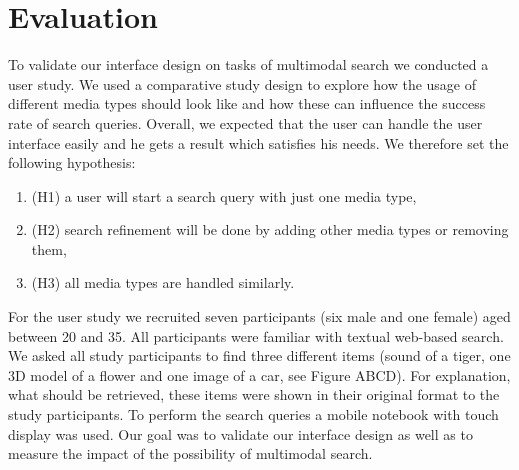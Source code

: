 \documentclass[runningheads,a4paper]{llncs} \usepackage[utf8]{inputenc}
\begin{document}
\section{Evaluation}

To validate our interface design on tasks of multimodal search we conducted a
user study. We used a comparative study design to explore how the usage of
different media types should look like and how these can influence the success
rate of search queries. Overall, we expected that the user can handle the user
interface easily and he gets a result which satisfies his needs. We therefore
set the following hypothesis: 
\begin{enumerate}
  \item (H1) a user will start a search query with just
one media type,
  \item (H2) search refinement will be done by adding other media types
or removing them,
  \item (H3) all media types are handled similarly. 
\end{enumerate}

For the user study we recruited seven participants (six male and one female)
aged between 20 and 35. All participants were familiar with textual web-based
search. We asked all study participants to find three different items (sound of
a tiger, one 3D model of a flower and one image of a car, see Figure ABCD). For
explanation, what should be retrieved, these items were shown in their original
format to the study participants. To perform the search queries a mobile
notebook with touch display was used. Our goal was to validate our interface
design as well as to measure the impact of the possibility of multimodal search. 
\end{document}
